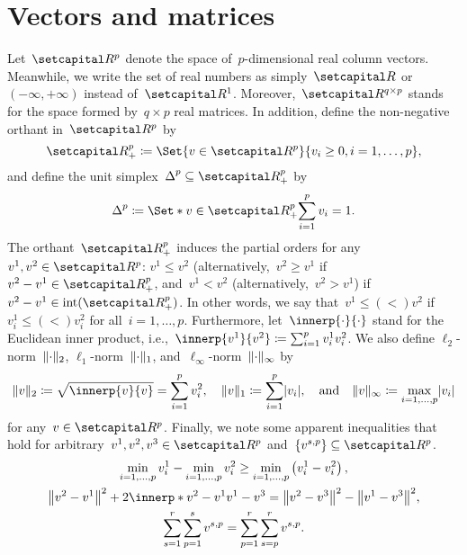 \documentclass[../main]{subfiles}
\begin{document}
\section{Vectors and matrices}
Let~$\setR^p$ denote the space of~$p$-dimensional real column vectors.
Meanwhile, we write the set of real numbers as simply~$\setR$ or~$(- \infty, + \infty)$ instead of~$\setR^1$.
Moreover,~$\setR^{q \times p}$ stands for the space formed by~$q \times p$ real matrices.
In addition, define the non-negative orthant in~$\setR^p$ by
\begin{equation}
    \setRpos^p \coloneqq \Set{v \in \setR^p}{v_i \ge 0, i = 1, \dots, p}
,\end{equation} 
and define the unit simplex~$\simplex^p \subseteq \setRpos^p$ by
\begin{equation} \label{eq:simplex}
    \simplex^p \coloneqq \Set*{v \in \setRpos^p}{\sum_{i = 1}^{p} v_i = 1}
.\end{equation} 
The orthant~$\setRpos^p$ induces the partial orders for any~$v^1, v^2 \in \setR^p$: $v^1 \le v^2$ (alternatively,~$v^2 \ge v^1$ if~$v^2 - v^1 \in \setRpos^p$, and~$v^1 < v^2$ (alternatively,~$v^2 > v^1$) if~$v^2 - v^1 \in \interior(\setRpos^p)$.
In other words, we say that~$v^1 \mathrel{\le (<)} v^2$ if~$v^1_i \mathrel{\le (<)} v^2_i$ for all~$i = 1, \dots, p$.
Furthermore, let~$\innerp{\cdot}{\cdot}$ stand for the Euclidean inner product, i.e.,~$\innerp{v^1}{v^2} \coloneqq \sum_{i = 1}^{p} v^1_i v^2_i$.
We also define $\ell_2$-norm~$\lVert\cdot\rVert_2$, $\ell_1$-norm~$\lVert\cdot\rVert_1$, and~$\ell_\infty$-norm~$\lVert\cdot\rVert_\infty$ by
\begin{equation}
    \norm{v}_2 \coloneqq \sqrt{\innerp{v}{v}} = \sum_{i = 1}^{p} v_i^2, \quad \norm{v}_1 \coloneqq \sum_{i = 1}^{p} \abs{v_i}, \eqand \norm{v}_\infty \coloneqq \max_{i = 1, \dots, p} \abs{v_i}
\end{equation} 
for any~$v \in \setR^p$.
Finally, we note some apparent inequalities that hold for arbitrary~$v^1, v^2, v^3 \in \setR^p$ and~$\set{v^{s,p}} \subseteq \setR^p$.
\begin{gather} 
    \min_{i = 1, \dots, p} v^1_i - \min_{i = 1, \dots, p} v^2_i \ge \min_{i = 1, \dots, p} \left( v^1_i - v^2_i \right) \label{eq:min_diff_ineq}, \\
    \norm*{v^2 - v^1}^2 + 2 \innerp*{v^2 - v^1}{v^1 - v^3} = \norm*{ v^2 - v^3 }^2 - \norm*{v^1 - v^3}^2 \label{eq:Pythagoras}, \\
    \sum_{s=1}^r \sum_{p=1}^s v^{s,p} = \sum_{p=1}^r \sum_{s=p}^r v^{s,p} \label{eq:change sum}
.\end{gather}
\end{document}
